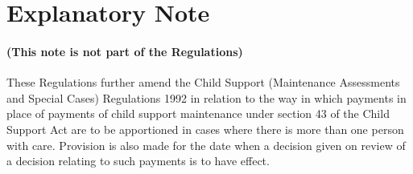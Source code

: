 \documentclass[a4paper]{article}
\newcommand{\parthead}{}
\begin{document}
\part{Explanatory Note}

\renewcommand\parthead{--- Explanatory Note}

\subsection*{(This note is not part of the Regulations)}

These Regulations further amend the Child Support (Maintenance Assessments and Special Cases) Regulations 1992 in relation to the way in which payments in place of payments of child support maintenance under section 43 of the Child Support Act are to be apportioned in cases where there is more than one person with care. Provision is also made for the date when a decision given on review of a decision relating to such payments is to have effect.
\end{document}
